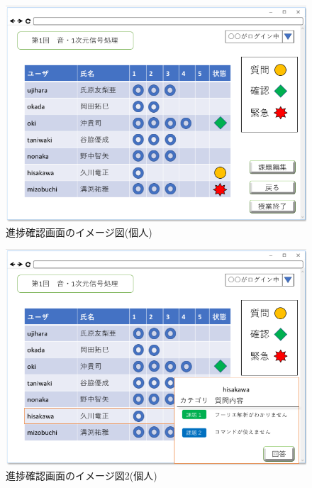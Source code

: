 \begin{figure}[phtbp]
  \begin{center}
    \includegraphics[width=1\linewidth,clip]{./img/22.png}
    \caption{進捗確認画面のイメージ図(個人)}\label{fig:22}
  \end{center}
\end{figure}

\begin{figure}[phtbp]
  \begin{center}
    \includegraphics[width=1\linewidth,clip]{./img/23.png}
    \caption{進捗確認画面のイメージ図2(個人)}\label{fig:23}
  \end{center}
\end{figure}

\newpage

